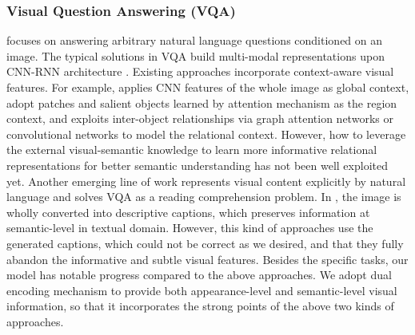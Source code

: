 \documentclass[letterpaper]{article} \usepackage{aaai20}  \usepackage{times}  \usepackage{helvet} \usepackage{courier}  \usepackage[hyphens]{url}  \usepackage{graphicx} \urlstyle{rm} \def\UrlFont{\rm}  \usepackage{graphicx}  \frenchspacing  \setlength{\pdfpagewidth}{8.5in}  \setlength{\pdfpageheight}{11in}  \usepackage{mathrsfs} \usepackage{amsfonts,amssymb}  \usepackage{tabularx} \usepackage{url}
\begin{document}
\subsubsection{Visual Question Answering (VQA)} focuses on answering arbitrary natural language questions conditioned on an image. The typical solutions in VQA build multi-modal representations upon CNN-RNN architecture \cite{ren2015exploring,wu2017image}. Existing approaches incorporate context-aware visual features. 
For example, \cite{ren2015exploring} applies CNN features of the whole image as global context, \cite{xu2016ask,anderson2018bottom-up} adopt patches and salient objects learned by attention mechanism as the region context, and \cite{gao2018question,li2019relation} exploits inter-object relationships via graph attention networks or convolutional networks to model the relational context. However, how to leverage the external visual-semantic knowledge to learn more informative relational representations for better semantic understanding has not been well exploited yet.   
Another emerging line of work represents visual content explicitly by natural language and solves VQA as a reading comprehension problem. In \cite{Li2019Visual}, the image is wholly converted into descriptive captions, which preserves information at semantic-level in textual domain. 
However, this kind of approaches use the generated captions, which could not be correct as we desired, and that they fully abandon the informative and subtle visual features.
Besides the specific tasks, our model has notable progress compared to the above approaches. We adopt dual encoding mechanism to provide both appearance-level and semantic-level visual information, so that it incorporates the strong points of the above two kinds of approaches. 
\end{document}
